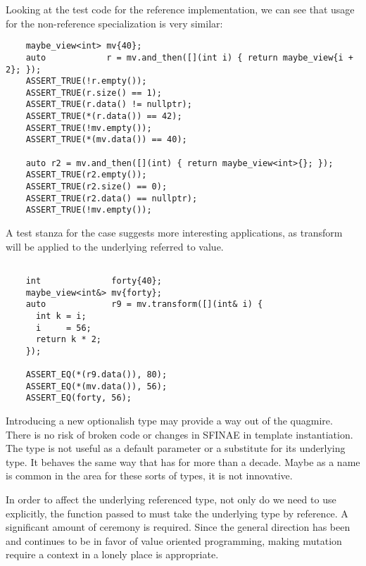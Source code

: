 \documentclass[a4paper,10pt,oneside,openany,final,article]{memoir}
\begin{document}
Looking at the test code for the reference implementation, we can see that usage for the non-reference specialization is very similar:

\begin{minipage}[t]{\linewidth}
  \begin{verbatim}
    maybe_view<int> mv{40};
    auto            r = mv.and_then([](int i) { return maybe_view{i + 2}; });
    ASSERT_TRUE(!r.empty());
    ASSERT_TRUE(r.size() == 1);
    ASSERT_TRUE(r.data() != nullptr);
    ASSERT_TRUE(*(r.data()) == 42);
    ASSERT_TRUE(!mv.empty());
    ASSERT_TRUE(*(mv.data()) == 40);

    auto r2 = mv.and_then([](int) { return maybe_view<int>{}; });
    ASSERT_TRUE(r2.empty());
    ASSERT_TRUE(r2.size() == 0);
    ASSERT_TRUE(r2.data() == nullptr);
    ASSERT_TRUE(!mv.empty());

  \end{verbatim}
\end{minipage}

A test stanza for the  case suggests more interesting applications, as transform will be applied to the underlying referred to value.

\begin{minipage}[t]{\linewidth}
  \begin{verbatim}

    int              forty{40};
    maybe_view<int&> mv{forty};
    auto             r9 = mv.transform([](int& i) {
      int k = i;
      i     = 56;
      return k * 2;
    });

    ASSERT_EQ(*(r9.data()), 80);
    ASSERT_EQ(*(mv.data()), 56);
    ASSERT_EQ(forty, 56);

  \end{verbatim}
\end{minipage}

Introducing a new optionalish type may provide a way out of the  quagmire. There is no risk of broken code or changes in SFINAE in template instantiation. The type  is not useful as a default parameter or a substitute for its underlying type. It behaves the same way that  has for more than a decade. Maybe as a name is common in the area for these sorts of types, it is not innovative.

In order to affect the underlying referenced type, not only do we need to use  explicitly, the function passed to  must take the underlying type by reference. A significant amount of ceremony is required. Since the general direction has been and continues to be in favor of value oriented programming, making mutation require a context in a lonely place is appropriate.
\end{document}
